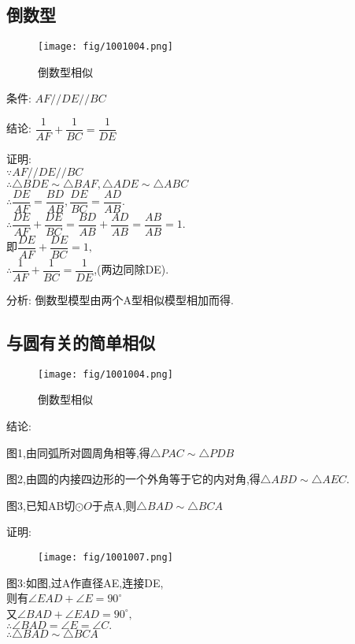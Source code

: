 \documentclass[cn,blue,10pt]{elegantbook}
\begin{document}
\subsection{倒数型}%
\label{sub:倒数型}
\begin{figure}[h]
    \centering
    \texttt{[image: fig/1001004.png]}
    \caption{倒数型相似}%
    \label{fig:倒数型相似}
\end{figure}
条件: \(AF // DE // BC\) 

结论: \(\dfrac{1}{AF}+\dfrac{1}{BC}=\dfrac{1}{DE}\) 

证明:\\
\(\because  AF // DE // BC\) \\
\(\therefore \triangle BDE \sim \triangle BAF, \triangle ADE \sim \triangle ABC\)\\
\(\therefore \dfrac{DE}{AF}=\dfrac{BD}{AB},\dfrac{DE}{BC}=\dfrac{AD}{AB}.\)\\
\(\therefore \dfrac{DE}{AF}+\dfrac{DE}{BC}=\dfrac{BD}{AB}+\dfrac{AD}{AB}=\dfrac{AB}{AB}=1.\)\\
即\(\dfrac{DE}{AF}+\dfrac{DE}{BC}=1,\)\\
\(\therefore \dfrac{1}{AF}+\dfrac{1}{BC}=\dfrac{1}{DE}\),(两边同除DE).

分析: 倒数型模型由两个A型相似模型相加而得.

\subsection{与圆有关的简单相似}%
\label{sub:与圆有关的简单相似}
\begin{figure}[h]
    \centering
    \texttt{[image: fig/1001004.png]}
    \caption{倒数型相似}%
    \label{fig:倒数型相似}
\end{figure}

结论:

图1,由同弧所对圆周角相等,得\(\triangle PAC \sim \triangle PDB\)

图2,由圆的内接四边形的一个外角等于它的内对角,得\(\triangle ABD \sim \triangle AEC.\)

图3,已知AB切\(\odot O\)于点A,则\(\triangle BAD \sim \triangle BCA\)

证明:
\begin{figure}[H]
    \centering
    \texttt{[image: fig/1001007.png]}
    \label{fig:1001007}
\end{figure}
图3:如图,过A作直径AE,连接DE,\\
则有\(\angle EAD+\angle E=90^\circ \) \\
又\(\angle BAD + \angle EAD = 90^\circ,\)\\
\(\therefore \angle BAD=\angle E=\angle C.\)\\
\(\therefore \triangle BAD \sim \triangle BCA\)
\end{document}
